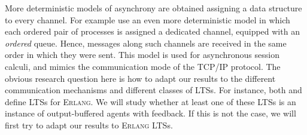 More deterministic models of asynchrony are obtained assigning a data
structure to every channel. %
%
For example \cite{HYC08,HYC16} use an even more deterministic model
in which each ordered pair of processes is assigned a dedicated
channel, equipped with an {\em ordered} queue. Hence, messages along
such channels are received in the same order in which they were sent.
  This model is used for asynchronous session calculi, and mimics the
  communication mode of the TCP/IP protocol.  The obvious research
  question here is how to adapt our results to the different
  communication mechanisms and different classes of LTSs. For
  instance, both \cite{Tanti2015TowardsSR} and \cite{caruana19}
  define LTSs for \textsc{Erlang}. We will study whether at least one
  of these LTSs is an instance of output-buffered agents with
  feedback. If this is not the case, we will first try to adapt our
  results to \textsc{Erlang} LTSs.


  
